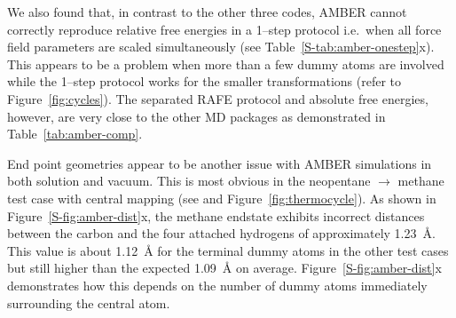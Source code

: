 \documentclass[journal=jctcce,manuscript=article]{achemso}
\begin{document}
We also found that, in contrast to the other three codes, AMBER cannot
correctly reproduce relative free energies in a 1--step protocol i.e.\
when all force field parameters are scaled simultaneously (see 
Table~\ref{S-tab:amber-onestep}x).  This appears to be a problem when more than 
a few dummy atoms are involved while the 1--step protocol works for the smaller 
transformations (refer to Figure~\ref{fig:cycles}).  The separated RAFE 
protocol and absolute free energies, however, are very close to the other MD 
packages as demonstrated in Table~\ref{tab:amber-comp}.

End point geometries appear to be another issue with AMBER simulations
in both solution and vacuum.  This is most obvious in the neopentane 
$\rightarrow$ methane test case with central mapping (see 
 and Figure~\ref{fig:thermocycle}).
As shown in Figure~\ref{S-fig:amber-dist}x, the methane endstate exhibits 
incorrect distances between the carbon and the four 
attached hydrogens of approximately \SI{1.23}{\angstrom}.  This value is about 
\SI{1.12}{\angstrom} for the terminal dummy atoms in the other test cases but 
still higher than the expected \SI{1.09}{\angstrom} on average.  
Figure~\ref{S-fig:amber-dist}x demonstrates how this depends on the number of 
dummy atoms immediately surrounding the central atom.
\end{document}
